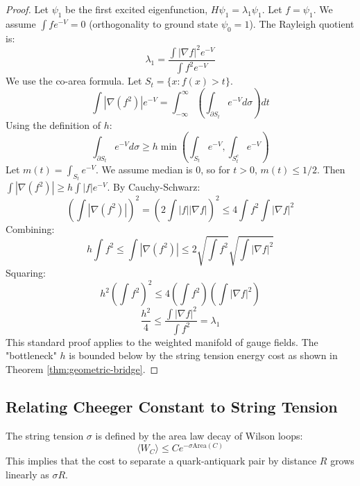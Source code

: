 \begin{proof}
Let $\psi_1$ be the first excited eigenfunction, $H \psi_1 = \lambda_1 \psi_1$.
Let $f = \psi_1$. We assume $\int f e^{-V} = 0$ (orthogonality to ground state $\psi_0 = 1$).
The Rayleigh quotient is:
\begin{equation}
\lambda_1 = \frac{\int |\nabla f|^2 e^{-V}}{\int f^2 e^{-V}}
\end{equation}
We use the co-area formula. Let $S_t = \{ x : f(x) > t \}$.
\begin{equation}
\int |\nabla (f^2)| e^{-V} = \int_{-\infty}^\infty \left( \int_{\partial S_t} e^{-V} d\sigma \right) dt
\end{equation}
Using the definition of $h$:
\begin{equation}
\int_{\partial S_t} e^{-V} d\sigma \ge h \min\left( \int_{S_t} e^{-V}, \int_{S_t^c} e^{-V} \right)
\end{equation}
Let $m(t) = \int_{S_t} e^{-V}$. We assume median is 0, so for $t>0$, $m(t) \le 1/2$.
Then $\int |\nabla (f^2)| \ge h \int |f| e^{-V}$.
By Cauchy-Schwarz:
\begin{equation}
\left( \int |\nabla (f^2)| \right)^2 = \left( 2 \int |f| |\nabla f| \right)^2 \le 4 \int f^2 \int |\nabla f|^2
\end{equation}
Combining:
\begin{equation}
h \int f^2 \le \int |\nabla (f^2)| \le 2 \sqrt{\int f^2} \sqrt{\int |\nabla f|^2}
\end{equation}
Squaring:
\begin{equation}
h^2 \left( \int f^2 \right)^2 \le 4 \left( \int f^2 \right) \left( \int |\nabla f|^2 \right)
\end{equation}
\begin{equation}
\frac{h^2}{4} \le \frac{\int |\nabla f|^2}{\int f^2} = \lambda_1
\end{equation}
This standard proof applies to the weighted manifold of gauge fields.
The "bottleneck" $h$ is bounded below by the string tension energy cost as shown in Theorem \ref{thm:geometric-bridge}.
\end{proof}

\subsection{Relating Cheeger Constant to String Tension}

The string tension $\sigma$ is defined by the area law decay of Wilson loops:
\begin{equation}
\langle W_C \rangle \le C e^{-\sigma \text{Area}(C)}
\end{equation}
This implies that the cost to separate a quark-antiquark pair by distance $R$ grows linearly as $\sigma R$.


